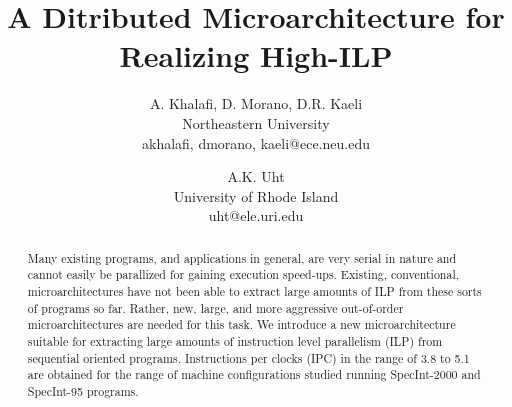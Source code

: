 \documentclass[10pt,twocolumn]{IEEEtran}
\begin{document}
%
\parskip 2mm
%
%
\title{A Ditributed Microarchitecture for Realizing High-ILP}
%
\author{
A. Khalafi, D. Morano, D.R. Kaeli\\
Northeastern University\\
{akhalafi, dmorano, kaeli}@ece.neu.edu\\
\and
A.K. Uht\\
University of Rhode Island\\ 
uht@ele.uri.edu
}
%
%
%
%
\maketitle
%
%
%
\begin{abstract}
Many existing programs, and applications in general, are
very serial in nature and cannot easily be parallized
for gaining execution speed-ups.
Existing, conventional, microarchitectures have not
been able to extract large amounts of ILP from these sorts of
programs so far.
Rather, new, large, and more aggressive out-of-order microarchitectures
are needed for this task.
We introduce a new microarchitecture suitable for extracting
large amounts of instruction level parallelism (ILP) from sequential
oriented programs.
Instructions per clocks (IPC)
in the range of 3.8 to 5.1 are obtained for the
range of machine configurations studied running SpecInt-2000 and
SpecInt-95 programs. 
\end{abstract}
%
%
\end{document}
